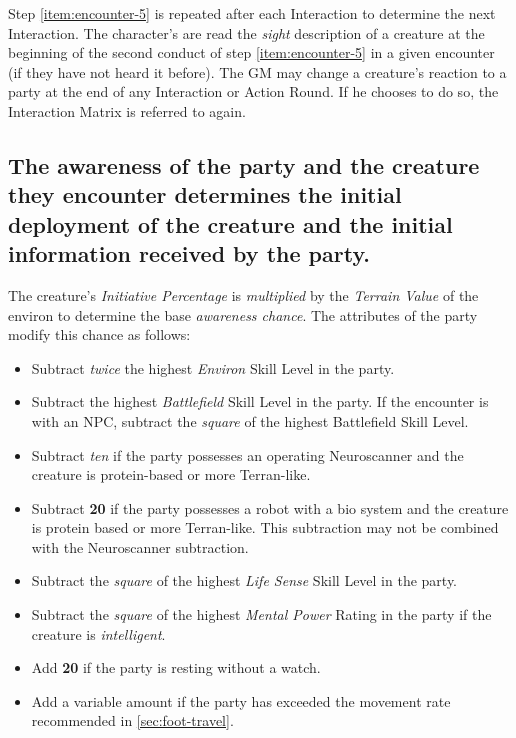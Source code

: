 Step \ref{item:encounter-5} is repeated after each Interaction to determine the
next Interaction. The character's are read the \emph{sight}
description of a creature at the beginning of the second conduct of
step \ref{item:encounter-5} in a given encounter (if they have not heard it
before). The GM may change a creature's reaction to a party at the end
of any Interaction or Action Round. If he chooses to do so, the
Interaction Matrix is referred to again.

\subsection[Awareness]{The awareness of the party and the creature
  they encounter determines the initial deployment of the creature and
  the initial information received by the party.} 
\label{sec:awareness}



The creature's \emph{Initiative Percentage} is \emph{multiplied} by
the \emph{Terrain Value} of the environ to determine the base
\emph{awareness chance}. The attributes of the party modify this
chance as follows:

\begin{itemize}
\item Subtract \emph{twice} the highest \emph{Environ} Skill Level in
  the party.
\item Subtract the highest \emph{Battlefield} Skill Level in the
  party. If the encounter is with an NPC, subtract the \emph{square}
  of the highest Battlefield Skill Level.
\item Subtract \emph{ten} if the party possesses an operating
  Neuroscanner and the creature is protein-based or more Terran-like.
\item Subtract \textbf{20} if the party possesses a robot with a bio
  system and the creature is protein based or more Terran-like. This
  subtraction may not be combined with the Neuroscanner subtraction.
\item Subtract the \emph{square} of the highest \emph{Life Sense}
  Skill Level in the party.
\item Subtract the \emph{square} of the highest \emph{Mental Power}
  Rating in the party if the creature is \emph{intelligent}.
\item Add \textbf{20} if the party is resting without a watch.
\item Add a variable amount if the party has exceeded the movement
  rate recommended in \ref{sec:foot-travel}.
\end{itemize}

